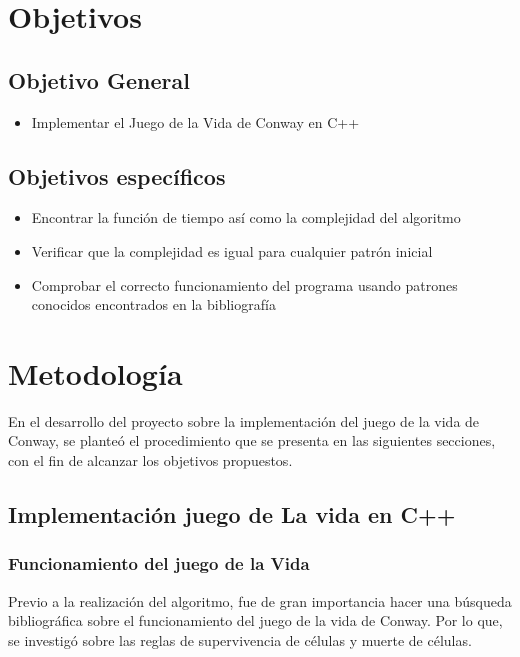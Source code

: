 \documentclass[12pt,letterpaper]{article}
\newenvironment{objectives}
{%
\begin{easylist}
}
{
\end{easylist}
}
\begin{document}
\newpage 
\section{Objetivos}
\subsection{Objetivo General}
\begin{itemize}
\item Implementar el Juego de la Vida de Conway en C++
\end{itemize}

\subsection{Objetivos específicos}

\begin{objectives}
\begin{itemize}
\item Encontrar la función de tiempo así como la complejidad del algoritmo
\item Verificar que la complejidad es igual para cualquier patrón inicial
\item Comprobar el correcto funcionamiento del programa usando patrones conocidos encontrados en la bibliografía
\end{itemize}

\end{objectives}

\newpage 
\section{Metodología}
\vspace{1em}
En el desarrollo del proyecto sobre la implementación del juego de la vida de Conway, se planteó el procedimiento que se presenta en las siguientes secciones, con el fin de alcanzar los objetivos propuestos.

\subsection{Implementación juego de La vida en C++}

\subsubsection{Funcionamiento del juego de la Vida}
Previo a la realización del algoritmo, fue de gran importancia hacer una búsqueda bibliográfica sobre el funcionamiento del juego de la vida de Conway. Por lo que, se investigó sobre las reglas de supervivencia de células y muerte de células.
\end{document}

